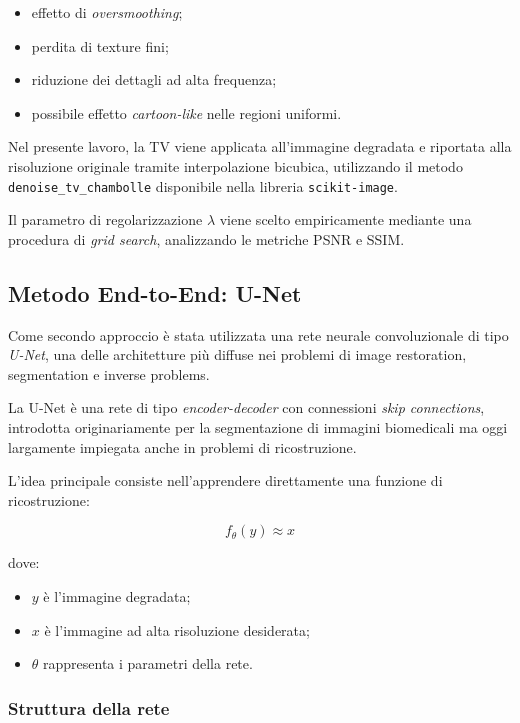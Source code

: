 \documentclass{article}
\begin{document}
\begin{itemize}
    \item effetto di \textit{oversmoothing};
    \item perdita di texture fini;
    \item riduzione dei dettagli ad alta frequenza;
    \item possibile effetto \textit{cartoon-like} nelle regioni uniformi.
\end{itemize}

Nel presente lavoro, la TV viene applicata all’immagine degradata e riportata alla risoluzione originale tramite interpolazione bicubica, utilizzando il metodo \texttt{denoise\_tv\_chambolle} disponibile nella libreria \texttt{scikit-image}.

Il parametro di regolarizzazione \(\lambda\) viene scelto empiricamente mediante una procedura di \textit{grid search}, analizzando le metriche PSNR e SSIM.

\subsection{Metodo End-to-End: U-Net}

Come secondo approccio è stata utilizzata una rete neurale convoluzionale di tipo \textit{U-Net}, una delle architetture più diffuse nei problemi di image restoration, segmentation e inverse problems.

La U-Net è una rete di tipo \textit{encoder-decoder} con connessioni \textit{skip connections}, introdotta originariamente per la segmentazione di immagini biomedicali ma oggi largamente impiegata anche in problemi di ricostruzione.

L’idea principale consiste nell’apprendere direttamente una funzione di ricostruzione:

\[
f_{\theta}(y)
\approx x
\]

dove:

\begin{itemize}
    \item \(y\) è l’immagine degradata;
    \item \(x\) è l’immagine ad alta risoluzione desiderata;
    \item \(\theta\) rappresenta i parametri della rete.
\end{itemize}

\subsubsection{Struttura della rete}
\end{document}
